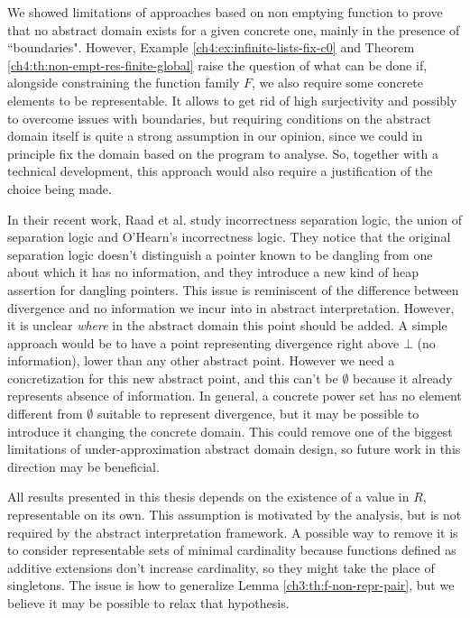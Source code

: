 We showed limitations of approaches based on non emptying function to prove that no abstract domain exists for a given concrete one, mainly in the presence of ``boundaries". However, Example \ref{ch4:ex:infinite-lists-fix-c0} and Theorem \ref{ch4:th:non-empt-res-finite-global} raise the question of what can be done if, alongside constraining the function family $F$, we also require some concrete elements to be representable. It allows to get rid of high surjectivity and possibly to overcome issues with boundaries, but requiring conditions on the abstract domain itself is quite a strong assumption in our opinion, since we could in principle fix the domain based on the program to analyse. So, together with a technical development, this approach would also require a justification of the choice being made.

In their recent work, Raad et al. \cite{incorrectness-separation-logic} study incorrectness separation logic, the union of separation logic \cite{reynolds-incorrectness-logic} and O'Hearn's incorrectness logic. They notice that the original separation logic doesn't distinguish a pointer known to be dangling from one about which it has no information, and they introduce a new kind of heap assertion for dangling pointers. This issue is reminiscent of the difference between divergence and no information we incur into in abstract interpretation. However, it is unclear \textit{where} in the abstract domain this point should be added. A simple approach would be to have a point representing divergence right above $\bot$ (no information), lower than any other abstract point.
However we need a concretization for this new abstract point, and this can't be $\emptyset$ because it already represents absence of information. In general, a concrete power set has no element different from $\emptyset$ suitable to represent divergence, but it may be possible to introduce it changing the concrete domain. This could remove one of the biggest limitations of under-approximation abstract domain design, so future work in this direction may be beneficial.

All results presented in this thesis depends on the existence of a value in $R$, representable on its own. This assumption is motivated by the analysis, but is not required by the abstract interpretation framework. A possible way to remove it is to consider representable sets of minimal cardinality because functions defined as additive extensions don't increase cardinality, so they might take the place of singletons. The issue is how to generalize Lemma \ref{ch3:th:f-non-repr-pair}, but we believe it may be possible to relax that hypothesis.

